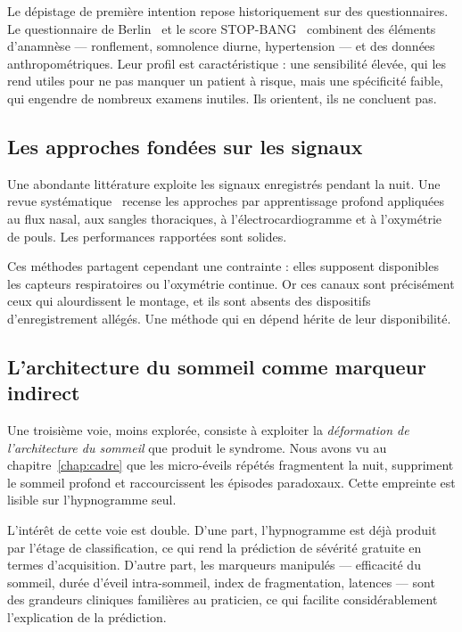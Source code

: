 Le dépistage de première intention repose historiquement sur des questionnaires. Le
questionnaire de Berlin~\cite{netzer1999} et le score STOP-BANG~\cite{chung2008}
combinent des éléments d'anamnèse — ronflement, somnolence diurne, hypertension — et
des données anthropométriques. Leur profil est caractéristique : une sensibilité
élevée, qui les rend utiles pour ne pas manquer un patient à risque, mais une
spécificité faible, qui engendre de nombreux examens inutiles. Ils orientent, ils ne
concluent pas.

\subsection{Les approches fondées sur les signaux}

Une abondante littérature exploite les signaux enregistrés pendant la nuit. Une revue
systématique~\cite{mostafa2019} recense les approches par apprentissage profond
appliquées au flux nasal, aux sangles thoraciques, à l'électrocardiogramme et à
l'oxymétrie de pouls. Les performances rapportées sont solides.

Ces méthodes partagent cependant une contrainte : elles supposent disponibles les
capteurs respiratoires ou l'oxymétrie continue. Or ces canaux sont précisément ceux
qui alourdissent le montage, et ils sont absents des dispositifs d'enregistrement
allégés. Une méthode qui en dépend hérite de leur disponibilité.

\subsection{L'architecture du sommeil comme marqueur indirect}

Une troisième voie, moins explorée, consiste à exploiter la \emph{déformation de
l'architecture du sommeil} que produit le syndrome. Nous avons vu au
chapitre~\ref{chap:cadre} que les micro-éveils répétés fragmentent la nuit,
suppriment le sommeil profond et raccourcissent les épisodes paradoxaux. Cette
empreinte est lisible sur l'hypnogramme seul.

L'intérêt de cette voie est double. D'une part, l'hypnogramme est déjà produit par
l'étage de classification, ce qui rend la prédiction de sévérité gratuite en termes
d'acquisition. D'autre part, les marqueurs manipulés — efficacité du sommeil, durée
d'éveil intra-sommeil, index de fragmentation, latences — sont des grandeurs
cliniques familières au praticien, ce qui facilite considérablement l'explication de
la prédiction.

